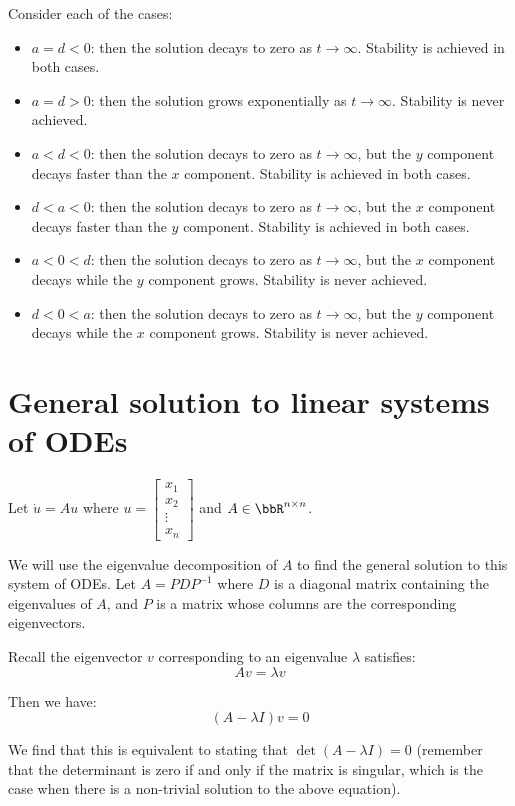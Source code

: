 Consider each of the cases:
\begin{itemize}
\item $a = d < 0$: then the solution decays to zero as $t \to \infty$. Stability is achieved in both cases.
\item $a = d > 0$: then the solution grows exponentially as $t \to \infty$. Stability is never achieved.
\item $a < d < 0$: then the solution decays to zero as $t \to \infty$, but the $y$ component decays faster than the $x$ component. Stability is achieved in both cases.
\item $d < a < 0$: then the solution decays to zero as $t \to \infty$, but the $x$ component decays faster than the $y$ component. Stability is achieved in both cases.
\item $a < 0 < d$: then the solution decays to zero as $t \to \infty$, but the $x$ component decays while the $y$ component grows. Stability is never achieved.
\item $d < 0 < a$: then the solution decays to zero as $t \to \infty$, but the $y$ component decays while the $x$ component grows. Stability is never achieved.
\end{itemize}

\section{General solution to linear systems of ODEs}
Let $\dot{u} = Au$ where $u = \begin{bmatrix}x_1 \\
x_2 \\
\vdots \\
x_n
\end{bmatrix}$ and $A \in \bbR^{n \times n}$.

We will use the eigenvalue decomposition of $A$ to find the general solution to this system of ODEs. Let $A = PDP^{-1}$ where $D$ is a diagonal matrix containing the eigenvalues of $A$, and $P$ is a matrix whose columns are the corresponding eigenvectors.

Recall the eigenvector $v$ corresponding to an eigenvalue $\lambda$ satisfies:
\begin{equation*}
Av = \lambda v
\end{equation*}

Then we have:
\begin{equation*}
(A - \lambda I) v = 0
\end{equation*}

We find that this is equivalent to stating that $\det(A - \lambda I) = 0$ (remember that the determinant is zero if and only if the matrix is singular, which is the case when there is a non-trivial solution to the above equation). 

